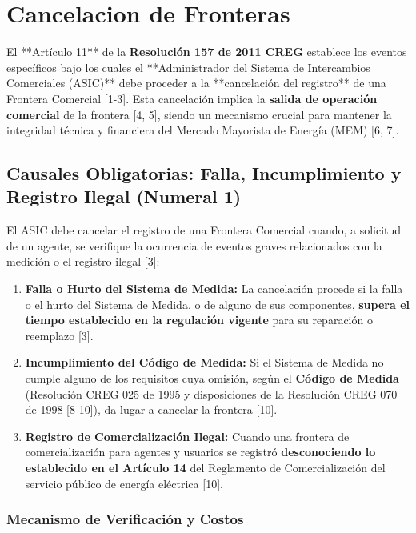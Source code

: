 \documentclass[a5paper]{book}%
\begin{document}
\section{Cancelacion de Fronteras}

El **Artículo 11** de la \textbf{Resolución 157 de 2011 CREG} establece los eventos específicos bajo los cuales el **Administrador del Sistema de Intercambios Comerciales (ASIC)** debe proceder a la **cancelación del registro** de una Frontera Comercial [1-3]. Esta cancelación implica la \textbf{salida de operación comercial} de la frontera [4, 5], siendo un mecanismo crucial para mantener la integridad técnica y financiera del Mercado Mayorista de Energía (MEM) [6, 7].

\subsection{Causales Obligatorias: Falla, Incumplimiento y Registro Ilegal (Numeral 1)}

El ASIC debe cancelar el registro de una Frontera Comercial cuando, a solicitud de un agente, se verifique la ocurrencia de eventos graves relacionados con la medición o el registro ilegal [3]:

\begin{enumerate}
	\item \textbf{Falla o Hurto del Sistema de Medida:} La cancelación procede si la falla o el hurto del Sistema de Medida, o de alguno de sus componentes, \textbf{supera el tiempo establecido en la regulación vigente} para su reparación o reemplazo [3].
	\item \textbf{Incumplimiento del Código de Medida:} Si el Sistema de Medida no cumple alguno de los requisitos cuya omisión, según el \textbf{Código de Medida} (Resolución CREG 025 de 1995 y disposiciones de la Resolución CREG 070 de 1998 [8-10]), da lugar a cancelar la frontera [10].
	\item \textbf{Registro de Comercialización Ilegal:} Cuando una frontera de comercialización para agentes y usuarios se registró \textbf{desconociendo lo establecido en el Artículo 14} del Reglamento de Comercialización del servicio público de energía eléctrica [10].
\end{enumerate}

\subsubsection{Mecanismo de Verificación y Costos}
\end{document}
